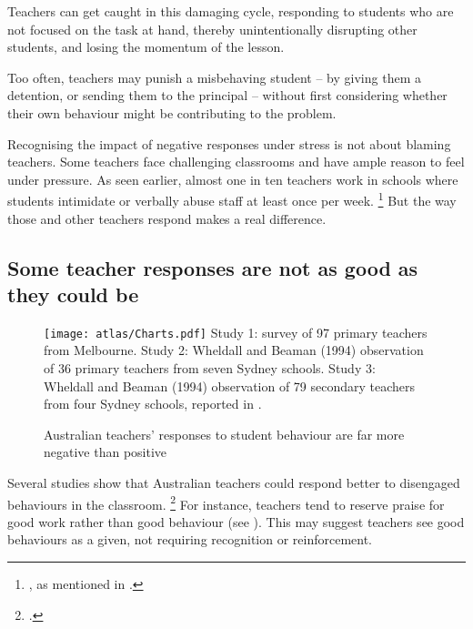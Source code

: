 \documentclass[FrontPage]{grattan}
\begin{document}
Teachers can get caught in this damaging cycle, responding to students who are not focused on the task at hand, thereby unintentionally disrupting other students, and losing the momentum of the lesson. 
 
Too often, teachers may punish a misbehaving student -- by giving them a detention, or sending them to the principal -- without first considering whether their own behaviour might be contributing to the problem.
 
Recognising the impact of negative responses under stress is not about blaming teachers. Some teachers face challenging classrooms and have ample reason to feel under pressure. As seen earlier, almost one in ten teachers work in schools where students intimidate or verbally abuse staff at least once per week.%
    \footnote{\textcite{Freeman2014AustralianTeachersLearning}, as mentioned in .}
But the way those and other teachers respond makes a real difference.
\subsection{Some teacher responses are not as good as they could be}\label{subsec:some-teacher-responses}

\begin{figure}
\caption{Australian teachers' responses to student behaviour are far more negative than positive}\label{fig:responses-more-negative}
\texttt{[image: atlas/Charts.pdf]}
%
{Study 1: \textcite{CluniesRoss-2008-Use-proactive-reactive-classroom-mgmt} survey of 97 primary teachers from Melbourne. Study 2: Wheldall and Beaman (1994) observation of 36 primary teachers from seven Sydney schools. Study 3: Wheldall and Beaman (1994) observation of 79 secondary teachers from four Sydney schools, reported in \textcite{BeamanWheldall-2000-Teachers-use-of-approval-disapproval}.}
\end{figure}


Several studies show that Australian teachers could respond better to disengaged behaviours in the classroom.%
    \footcites{Lewis2008StudentsReactionClassroom}{Montuoro2015StudentPerceptionsMisbehaviour}
For instance, teachers tend to reserve praise for good work rather than good behaviour (see ).
This may suggest teachers see good behaviours as a given, not requiring recognition or reinforcement.
 
\end{document}
